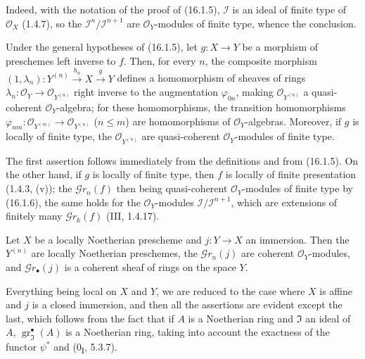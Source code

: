 Indeed, with the notation of the proof of (16.1.5), $\mathscr{I}$ is an
ideal of finite type of $\mathcal{O}_X$ (1.4.7), so the
$\mathscr{I}^n/\mathscr{I}^{n+1}$ are $\mathcal{O}_Y$-modules of finite type,
whence the conclusion.

\begin{corollary}[16.1.7]
\label{IV.16.1.7}
Under the general hypotheses of (16.1.5), let $g:X\to Y$ be a morphism of
preschemes left inverse to $f$. Then, for every $n$, the composite morphism
$(1,\lambda_n):Y^{(n)}\xrightarrow{h_n}X\xrightarrow{g}Y$ defines a
homomorphism of sheaves of rings
$\lambda_n:\mathcal{O}_Y\to\mathcal{O}_{Y^{(n)}}$ right inverse to
the augmentation $\varphi_{0n}$, making $\mathcal{O}_{Y^{(n)}}$ a
quasi-coherent $\mathcal{O}_Y$-algebra; for these homomorphisms, the
transition homomorphisms
$\varphi_{nm}:\mathcal{O}_{Y^{(m)}}\to\mathcal{O}_{Y^{(n)}}$ ($n\leq m$) are
homomorphisms of $\mathcal{O}_Y$-algebras. Moreover, if $g$ is locally
of finite type, the $\mathcal{O}_{Y^{(n)}}$ are quasi-coherent
$\mathcal{O}_Y$-modules of finite type.
\end{corollary}

The first assertion follows immediately from the definitions and from (16.1.5). On the
other hand, if $g$ is locally of finite type, then $f$ is locally of
finite presentation (1.4.3, (v)); the $\mathscr{G}r_n(f)$ then being
quasi-coherent $\mathcal{O}_Y$-modules of finite type by (16.1.6), the same holds
for the $\mathcal{O}_Y$-modules
$\mathscr{I}/\mathscr{I}^{n+1}$, which are extensions of finitely many
$\mathscr{G}r_k(f)$ (III, 1.4.17).

\begin{proposition}[16.1.8]
\label{IV.16.1.8}
Let $X$ be a locally Noetherian prescheme and $j:Y\to X$ an immersion. Then
the $Y^{(n)}$ are locally Noetherian preschemes, the
$\mathscr{G}r_n(j)$ are coherent $\mathcal{O}_Y$-modules, and
$\mathscr{G}r_\bullet(j)$ is a coherent sheaf of rings on the space $Y$.
\end{proposition}

Everything being local on $X$ and $Y$, we are reduced to the case where $X$ is affine
and $j$ is a closed immersion, and then all the assertions are evident except the
last, which follows from the fact that if $A$ is a Noetherian ring and
$\mathfrak{I}$ an ideal of $A$, $\operatorname{gr}_{\mathfrak{I}}^\bullet(A)$
is a Noetherian ring, taking into account the exactness of the functor $\psi^*$ and
(0\textsubscript{I}, 5.3.7).

